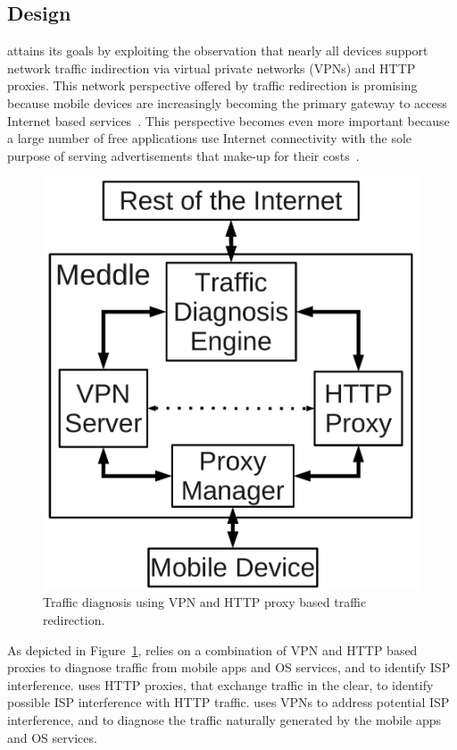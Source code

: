 \subsection{Design}

\meddle attains its goals by exploiting the observation that nearly all devices support network traffic indirection via virtual private networks (VPNs) and HTTP proxies. 
This network perspective offered by traffic redirection is promising because mobile devices are increasingly becoming the primary gateway to access Internet based services~\cite{ict:facts}. 
This perspective becomes even more important because a large number of free applications use Internet connectivity with the sole purpose of serving advertisements that make-up for their costs~\cite{pathak:eprof,vallina-rodriguez:bfc}.

\begin{figure}[h]
\centering
\includegraphics[width=\columnwidth]{figures/Meddle-Design.pdf}
\caption{Traffic diagnosis using VPN and HTTP proxy based traffic redirection.}
\label{fig:architecture}
\end{figure}
As depicted in Figure~\ref{fig:architecture}, \meddle relies on a combination of VPN and HTTP based proxies to diagnose traffic from mobile apps and OS services, and to identify ISP interference.
\meddle uses HTTP proxies, that exchange traffic in the clear, to identify possible ISP interference with HTTP traffic. 
\meddle uses VPNs to address potential ISP interference, and to diagnose the traffic naturally generated by the mobile apps and OS services.

